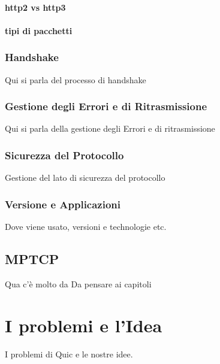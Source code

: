 \paragraph{http2 vs http3}
\paragraph{tipi di pacchetti}


\subsubsection{Handshake}

Qui si parla del processo di handshake

\subsubsection{Gestione degli Errori e di Ritrasmissione}

Qui si parla della gestione degli Errori e di ritrasmissione

\subsubsection{Sicurezza del Protocollo}

Gestione del lato di sicurezza del protocollo

\subsubsection{Versione e Applicazioni }
Dove viene usato, versioni e technologie etc.

\subsection{MPTCP}

Qua c'è molto da
Da pensare ai capitoli 

\section{I problemi e l'Idea}

I problemi di Quic e le nostre idee.


